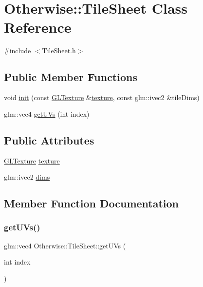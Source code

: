 \hypertarget{class_otherwise_1_1_tile_sheet}{}\section{Otherwise\+:\+:Tile\+Sheet Class Reference}
\label{class_otherwise_1_1_tile_sheet}


{\ttfamily \#include $<$Tile\+Sheet.\+h$>$}

\subsection*{Public Member Functions}
\begin{DoxyCompactItemize}
\item 
void \hyperlink{class_otherwise_1_1_tile_sheet_accf781918ebe300e907873e3dc4e612c}{init} (const \hyperlink{struct_otherwise_1_1_g_l_texture}{G\+L\+Texture} \&\hyperlink{class_otherwise_1_1_tile_sheet_a8d8adb1ce13204e31f9e9bfdce75b3b2}{texture}, const glm\+::ivec2 \&tile\+Dims)
\item 
glm\+::vec4 \hyperlink{class_otherwise_1_1_tile_sheet_a4c5a358848b90becc5163901334702f8}{get\+U\+Vs} (int index)
\end{DoxyCompactItemize}
\subsection*{Public Attributes}
\begin{DoxyCompactItemize}
\item 
\hyperlink{struct_otherwise_1_1_g_l_texture}{G\+L\+Texture} \hyperlink{class_otherwise_1_1_tile_sheet_a8d8adb1ce13204e31f9e9bfdce75b3b2}{texture}
\item 
glm\+::ivec2 \hyperlink{class_otherwise_1_1_tile_sheet_a407eb2284a5bd149b86c198dbab5d733}{dims}
\end{DoxyCompactItemize}


\subsection{Member Function Documentation}
\mbox{\label{class_otherwise_1_1_tile_sheet_a4c5a358848b90becc5163901334702f8}} 
\subsubsection{\texorpdfstring{get\+U\+Vs()}{getUVs()}}
{\footnotesize\ttfamily glm\+::vec4 Otherwise\+::\+Tile\+Sheet\+::get\+U\+Vs (\begin{DoxyParamCaption}\item[{int}]{index }\end{DoxyParamCaption})\hspace{0.3cm}{\ttfamily [inline]}}

